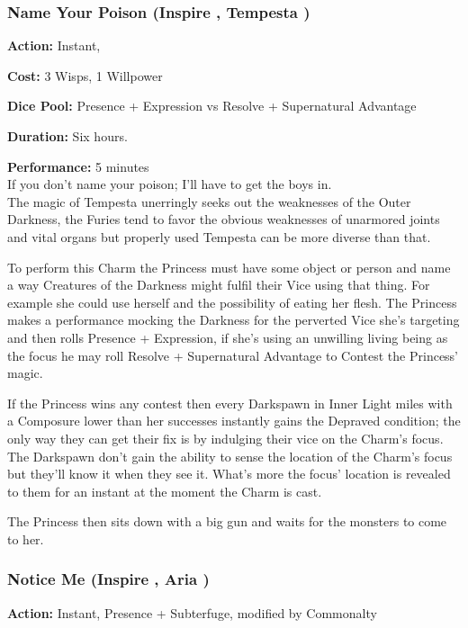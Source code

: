 \subsubsection*{Name Your Poison (Inspire \textbullet\textbullet\textbullet, Tempesta \textbullet\textbullet\textbullet)}

\noindent \textbf{Action:} Instant, 

\noindent \textbf{Cost:} 3 Wisps, 1 Willpower

\noindent \textbf{Dice Pool:} Presence + Expression vs Resolve + Supernatural Advantage

\noindent \textbf{Duration:} Six hours.

\noindent \textbf{Performance:} 5 minutes \\

\noindent If you don't name your poison; I'll have to get the boys in.\\

\noindent The magic of Tempesta unerringly seeks out the weaknesses of the Outer Darkness, the Furies tend to favor the obvious weaknesses of unarmored joints and vital organs but properly used Tempesta can be more diverse than that.

To perform this Charm the Princess must have some object or person and name a way Creatures of the Darkness might fulfil their Vice using that thing. For example she could use herself and the possibility of eating her flesh. The Princess makes a performance mocking the Darkness for the perverted Vice she's targeting and then rolls Presence + Expression, if she's using an unwilling living being as the focus he may roll Resolve + Supernatural Advantage to Contest the Princess' magic.

If the Princess wins any contest then every Darkspawn in Inner Light miles with a Composure lower than her successes instantly gains the Depraved condition; the only way they can get their fix is by indulging their vice on the Charm's focus. The Darkspawn don't gain the ability to sense the location of the Charm's focus but they'll know it when they see it. What's more the focus' location is revealed to them for an instant at the moment the Charm is cast.

The Princess then sits down with a big gun and waits for the monsters to come to her. 

\subsubsection*{Notice Me (Inspire \textbullet\textbullet\textbullet, Aria \textbullet\textbullet)}
\noindent \textbf{Action:} Instant, Presence + Subterfuge, modified by Commonalty\\

